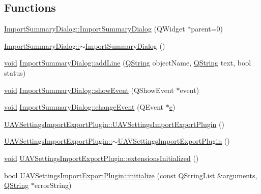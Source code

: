 \subsection*{\-Functions}
\begin{DoxyCompactItemize}
\item 
\hyperlink{group___u_a_v_settings_import_export_ga715ec099ff29a7acc3887e20f22219da}{\-Import\-Summary\-Dialog\-::\-Import\-Summary\-Dialog} (\-Q\-Widget $\ast$parent=0)
\item 
\hyperlink{group___u_a_v_settings_import_export_gaf410b79676dfd8f6636650a3d9ef48e2}{\-Import\-Summary\-Dialog\-::$\sim$\-Import\-Summary\-Dialog} ()
\item 
\hyperlink{group___u_a_v_objects_plugin_ga444cf2ff3f0ecbe028adce838d373f5c}{void} \hyperlink{group___u_a_v_settings_import_export_ga16fa18af8950ac368ac63851b4c8e409}{\-Import\-Summary\-Dialog\-::add\-Line} (\hyperlink{group___u_a_v_objects_plugin_gab9d252f49c333c94a72f97ce3105a32d}{\-Q\-String} object\-Name, \hyperlink{group___u_a_v_objects_plugin_gab9d252f49c333c94a72f97ce3105a32d}{\-Q\-String} text, bool status)
\item 
\hyperlink{group___u_a_v_objects_plugin_ga444cf2ff3f0ecbe028adce838d373f5c}{void} \hyperlink{group___u_a_v_settings_import_export_gad8e0a82289892d886b2e350ea7dd1faf}{\-Import\-Summary\-Dialog\-::show\-Event} (\-Q\-Show\-Event $\ast$event)
\item 
\hyperlink{group___u_a_v_objects_plugin_ga444cf2ff3f0ecbe028adce838d373f5c}{void} \hyperlink{group___u_a_v_settings_import_export_ga31da7a0667d03f1e71cd5012bee5b544}{\-Import\-Summary\-Dialog\-::change\-Event} (\-Q\-Event $\ast$\hyperlink{_o_p_plots_8m_a9425be9aab51621e317ba7ade564b570}{e})
\item 
\hyperlink{group___u_a_v_settings_import_export_gad19bf02649bc86e8245c1ad401db02b7}{\-U\-A\-V\-Settings\-Import\-Export\-Plugin\-::\-U\-A\-V\-Settings\-Import\-Export\-Plugin} ()
\item 
\hyperlink{group___u_a_v_settings_import_export_ga14bcad14e65bb435b384bc26e367f553}{\-U\-A\-V\-Settings\-Import\-Export\-Plugin\-::$\sim$\-U\-A\-V\-Settings\-Import\-Export\-Plugin} ()
\item 
\hyperlink{group___u_a_v_objects_plugin_ga444cf2ff3f0ecbe028adce838d373f5c}{void} \hyperlink{group___u_a_v_settings_import_export_ga8cbd9cce7f1b58c44d6dfdef36b50f81}{\-U\-A\-V\-Settings\-Import\-Export\-Plugin\-::extensions\-Initialized} ()
\item 
bool \hyperlink{group___u_a_v_settings_import_export_ga78fbb80d8d70b2e76652a80594215faf}{\-U\-A\-V\-Settings\-Import\-Export\-Plugin\-::initialize} (const \-Q\-String\-List \&arguments, \hyperlink{group___u_a_v_objects_plugin_gab9d252f49c333c94a72f97ce3105a32d}{\-Q\-String} $\ast$error\-String)

\end{DoxyCompactItemize}

